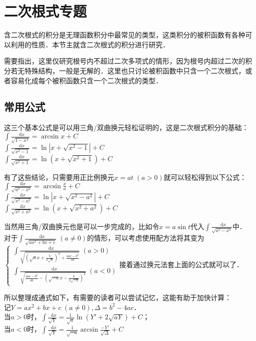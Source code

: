 \documentclass{ctexbook}
\newcommand*{\dif}{\mathop{}\!\mathrm{d}}
\begin{document}
\section{二次根式专题}
含二次根式的积分是无理函数积分中最常见的类型，这类积分的被积函数有各种可以利用的性质．本节主就含二次根式的积分进行研究．\par
需要指出，这里仅研究根号内不超过二次多项式的情形，因为根号内超过二次的积分若无特殊结构，一般是无解的．这里也只讨论被积函数中只含一个二次根式，或者容易化成每个被积函数只含一个二次根式的类型．\par
\subsection{常用公式}
这三个基本公式是可以用三角/双曲换元轻松证明的，这是二次根式积分的基础：\\
$\int\frac{\dif{x}}{\sqrt{1-x^{2}}}=\arcsin{x}+C$\\
$\int\frac{\dif{x}}{\sqrt{x^{2}-1}}=\ln{|x+\sqrt{x^{2}-1}|}+C$\\
$\int\frac{\dif{x}}{\sqrt{x^{2}+1}}=\ln{\left(x+\sqrt{x^{2}+1}\right)}+C$\par
有了这些结论，只需要用正比例换元$x=at\;\left(a>0\right)$就可以轻松得到以下公式：\\
$\int\frac{\dif{x}}{\sqrt{a^{2}-x^{2}}}=\arcsin{\frac{x}{a}}+C$\\
$\int\frac{\dif{x}}{\sqrt{x^{2}-a^{2}}}=\ln{|x+\sqrt{x^{2}-a^{2}}|}+C$\\
$\int\frac{\dif{x}}{\sqrt{x^{2}+a^{2}}}=\ln{\left(x+\sqrt{x^{2}+a^{2}}\right)}+C$\par
当然用三角/双曲换元也是可以一步完成的，比如令$x=a\sin{t}$代入$\int\frac{\dif{x}}{\sqrt{a^{2}-x^{2}}}$中．
对于$\int\frac{\dif{x}}{\sqrt{ax^{2}+bx+c}}\;\left(a\ne0\right)$的情形，可以考虑使用配方法将其变为$\begin{cases}\int\frac{\dif{x}}{\sqrt{\left(\sqrt{a}x+\frac{b}{2\sqrt{a}}\right)^{2}+\frac{4ac-b^{2}}{4a}}}\;\left(a>0\right)\\\int\frac{\dif{x}}{\sqrt{\frac{4ac-b^{2}}{4a}-\left(\sqrt{-a}x-\frac{b}{2\sqrt{-a}}\right)^{2}}}\;\left(a<0\right)\end{cases}$接着通过换元法套上面的公式就可以了．\par
所以整理成通式如下，有需要的读者可以尝试记忆，这能有助于加快计算：\\
记$Y=ax^{2}+bx+c\;\left(a\ne0\right),\Delta=b^{2}-4ac$．\\
当$a>0$时，$\int\frac{\dif{x}}{\sqrt{Y}}=\frac{1}{\sqrt{a}}\ln{\left(Y'+2\sqrt{aY}\right)}+C$；\\
当$a<0$时，$\int\frac{\dif{x}}{\sqrt{Y}}=\frac{1}{\sqrt{-a}}\arcsin{\frac{-Y'}{\sqrt{\Delta}}}+C$\par
\end{document}
